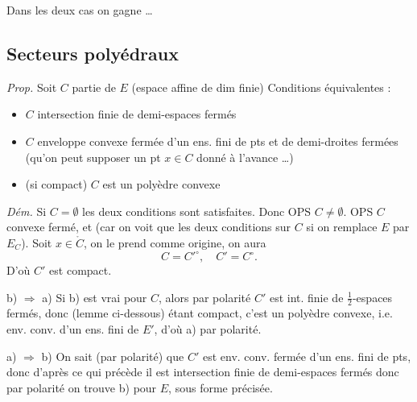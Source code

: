 \documentclass[11pt,a4paper]{article}
\begin{document}
Dans les deux cas on gagne …

\subsection{Secteurs polyédraux}

\emph{Prop.} Soit $C$ partie de $E$ (espace affine de dim finie) Conditions
équivalentes :
\begin{itemize}
  \item[a)] $C$ intersection finie de demi-espaces fermés
  \item[b)] $C$ enveloppe convexe fermée d'un ens. fini de pts et de
    demi-droites fermées (qu'on peut supposer 
      un pt $x \in C$ donné à
    l'avance …)
  \item[b')] (si compact) $C$ est un polyèdre convexe
\end{itemize}


\emph{Dém.} Si $C = \emptyset$ les deux conditions sont satisfaites. Donc OPS
$C \neq \emptyset$.  OPS
$C$ convexe fermé, et   (car on voit que les deux
conditions sur $C$  si on remplace $E$ par $E_C$).
Soit $x \in \mathring{C}$, on le prend comme origine, on aura
\[
  C = C'^\circ, \quad C' = C^\circ.
\]
D'où $C'$ est compact.

\struck{\ill{}}

b) $\Rightarrow$ a) Si b) est vrai pour $C$, alors par polarité $C'$ est
int. finie de $\frac{1}{2}$-espaces fermés, donc (lemme ci-dessous) étant
compact, c'est un polyèdre convexe, i.e. env. conv.  d'un
ens. fini de $E'$, d'où a) par polarité.


a) $\Rightarrow$ b) On sait (par polarité) que $C'$ est \struck{\ill{}} env.
conv. fermée d'un ens. fini de pts, donc d'après ce qui précède\struck{,
\ill{}} il est intersection finie de demi-espaces fermés\struck{\ill{}}
donc par polarité on trouve b) pour $E$, sous forme précisée.
\end{document}
